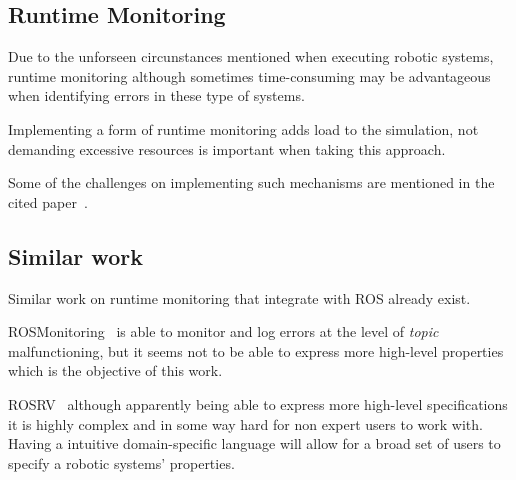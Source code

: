 \subsection{Runtime Monitoring}

Due to the unforseen circunstances mentioned when executing robotic systems, runtime monitoring although sometimes time-consuming may be advantageous when identifying errors in these type of systems.

Implementing a form of runtime monitoring adds load to the simulation, not demanding excessive resources is important when taking this approach.

Some of the challenges on implementing such mechanisms are mentioned in the cited paper~\cite{stadler2022towards}.

\subsection{Similar work}

Similar work on runtime monitoring that integrate with ROS already exist. 

ROSMonitoring~\cite{ferrando2020rosmonitoring} is able to monitor and log errors at the level of \textit{topic} malfunctioning, but it seems not to be able to express more high-level properties which is the objective of this work.

ROSRV~\cite{huang2014rosrv} although apparently being able to express more high-level specifications it is highly complex and in some way hard for non expert users to work with. Having a intuitive domain-specific language will allow for a broad set of users to specify a robotic systems' properties.
